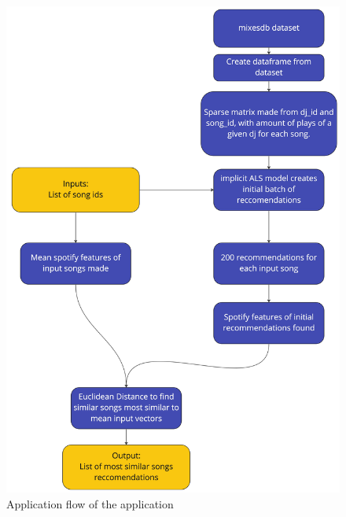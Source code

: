 \begin{figure}[H]
	\includegraphics[scale=0.1]{images/application_app_flow}
	\centering
	\caption{Application flow of the application} 
\end{figure}


